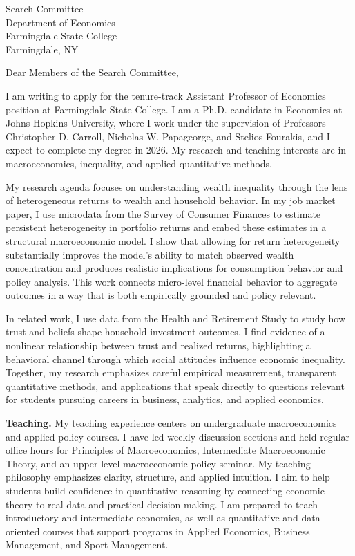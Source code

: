 \documentclass[11pt,letterpaper]{letter}
\begin{document}
\begin{letter}{Search Committee \\
Department of Economics \\
Farmingdale State College \\
Farmingdale, NY}

\opening{Dear Members of the Search Committee,}

I am writing to apply for the tenure-track Assistant Professor of Economics position at Farmingdale State College. I am a Ph.D. candidate in Economics at Johns Hopkins University, where I work under the supervision of Professors Christopher D. Carroll, Nicholas W. Papageorge, and Stelios Fourakis, and I expect to complete my degree in 2026. My research and teaching interests are in macroeconomics, inequality, and applied quantitative methods.

My research agenda focuses on understanding wealth inequality through the lens of heterogeneous returns to wealth and household behavior. In my job market paper, I use microdata from the Survey of Consumer Finances to estimate persistent heterogeneity in portfolio returns and embed these estimates in a structural macroeconomic model. I show that allowing for return heterogeneity substantially improves the model’s ability to match observed wealth concentration and produces realistic implications for consumption behavior and policy analysis. This work connects micro-level financial behavior to aggregate outcomes in a way that is both empirically grounded and policy relevant.

In related work, I use data from the Health and Retirement Study to study how trust and beliefs shape household investment outcomes. I find evidence of a nonlinear relationship between trust and realized returns, highlighting a behavioral channel through which social attitudes influence economic inequality. Together, my research emphasizes careful empirical measurement, transparent quantitative methods, and applications that speak directly to questions relevant for students pursuing careers in business, analytics, and applied economics.

\textbf{Teaching.} My teaching experience centers on undergraduate macroeconomics and applied policy courses. I have led weekly discussion sections and held regular office hours for Principles of Macroeconomics, Intermediate Macroeconomic Theory, and an upper-level macroeconomic policy seminar. My teaching philosophy emphasizes clarity, structure, and applied intuition. I aim to help students build confidence in quantitative reasoning by connecting economic theory to real data and practical decision-making. I am prepared to teach introductory and intermediate economics, as well as quantitative and data-oriented courses that support programs in Applied Economics, Business Management, and Sport Management.


\end{letter}
\end{document}
